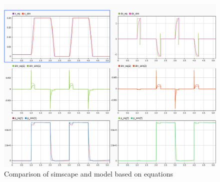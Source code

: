 \documentclass[class=article, crop=false]{standalone}
\begin{document}
\begin{figure}[h!]
    \centering
    \includegraphics[width=1\textwidth]{models_comparation.png}
    \caption{Comparison of simscape and model based on equations}
    \label{fig:compare_of_models}
\end{figure}
\end{document}
